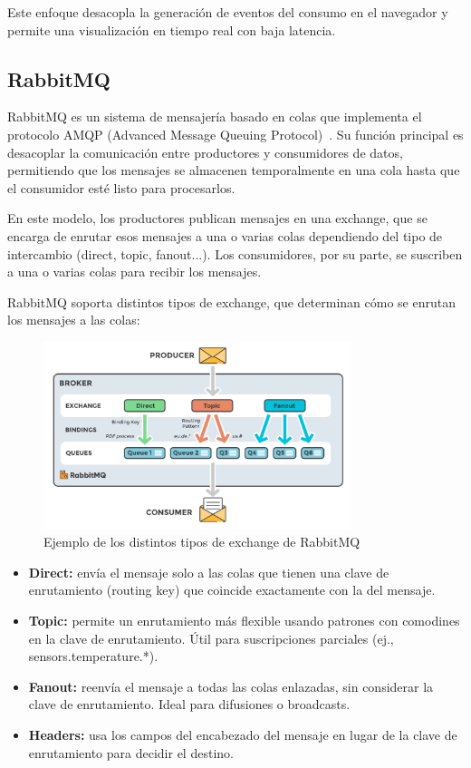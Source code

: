 Este enfoque desacopla la generación de eventos del consumo en el navegador y permite una visualización en tiempo real con baja latencia.

\subsection{RabbitMQ}

RabbitMQ es un sistema de mensajería basado en colas que implementa el protocolo AMQP (Advanced Message Queuing Protocol)~\cite{rabbitmq_docs}.
Su función principal es desacoplar la comunicación entre productores y consumidores de datos, permitiendo que los mensajes se almacenen temporalmente en una cola hasta que el consumidor esté listo para procesarlos.


En este modelo, los productores publican mensajes en una exchange, que se encarga de enrutar esos mensajes a una o varias colas dependiendo del tipo de intercambio (direct, topic, fanout...). Los consumidores, por su parte, se suscriben a una o varias colas para recibir los mensajes.

RabbitMQ soporta distintos tipos de exchange, que determinan cómo se enrutan los mensajes a las colas:

\begin{figure}[h]
    \centering
    \includegraphics[width=0.8\textwidth]{Imagenes/Bitmap/rabbitmq}
    \caption{Ejemplo de los distintos tipos de exchange de RabbitMQ}
    \label{fig:rabbit}
\end{figure}

\begin{itemize}
    \item \textbf{Direct:} envía el mensaje solo a las colas que tienen una clave de enrutamiento (routing key) que coincide exactamente con la del mensaje.

    \item \textbf{Topic:} permite un enrutamiento más flexible usando patrones con comodines en la clave de enrutamiento. Útil para suscripciones parciales (ej., sensors.temperature.*).

    \item \textbf{Fanout:} reenvía el mensaje a todas las colas enlazadas, sin considerar la clave de enrutamiento. Ideal para difusiones o broadcasts.

    \item \textbf{Headers:} usa los campos del encabezado del mensaje en lugar de la clave de enrutamiento para decidir el destino.
\end{itemize}

